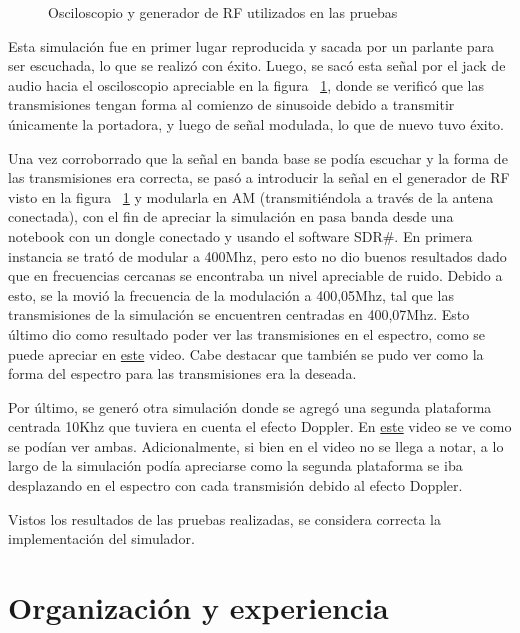 \documentclass[a4paper,10pt]{article}
\begin{document}
\begin{figure}[H]
\centering
{}
\caption{Osciloscopio y generador de RF utilizados en las pruebas}
\label{Test}
\end{figure}

Esta simulación fue en primer lugar reproducida y sacada por un parlante para ser escuchada, lo que se realizó con éxito. Luego, se sacó esta señal por el jack de audio hacia el osciloscopio apreciable en la figura ~\ref{Test}, donde se verificó que las transmisiones tengan forma al comienzo de sinusoide debido a transmitir únicamente la portadora, y luego de señal modulada, lo que de nuevo tuvo éxito.
\par
Una vez corroborrado que la señal en banda base se podía escuchar y la forma de las transmisiones era correcta, se pasó a introducir la señal en el generador de RF visto en la figura ~\ref{Test} y modularla en AM (transmitiéndola a través de la antena conectada), con el fin de apreciar la simulación en pasa banda desde una notebook con un dongle conectado y usando el software SDR\#. En primera instancia se trató de modular a 400Mhz, pero esto no dio buenos resultados dado que en frecuencias cercanas se encontraba un nivel apreciable de ruido. Debido a esto, se la movió la frecuencia de la modulación a  400,05Mhz, tal que las transmisiones de la simulación se encuentren centradas en 400,07Mhz. Esto último dio como resultado poder ver las transmisiones en el espectro, como se puede apreciar en \textcolor{blue}{\href {https://drive.google.com/file/d/1FieeQKkBJIfpKAu_4E4Ik1SV4s9q1Qw6/view?usp=sharing}{este}} video. Cabe destacar que también se pudo ver como la forma del espectro para las transmisiones era la deseada.
\par
Por último, se generó otra simulación donde se agregó una segunda plataforma centrada 10Khz que tuviera en cuenta el efecto Doppler. En  \textcolor{blue}{\href {https://drive.google.com/file/d/1FfI8xw6hzwwgcrzLQBHW1-g3nXa6ZuWW/view?usp=sharing}{este}} video se ve como se podían ver ambas. Adicionalmente, si bien en el video no se llega a notar, a lo largo de la simulación podía apreciarse como la segunda plataforma se iba desplazando en el espectro con cada transmisión debido al efecto Doppler.
\par
Vistos los resultados de las pruebas realizadas, se considera correcta la implementación del simulador.

\section{Organización y experiencia}
\end{document}
